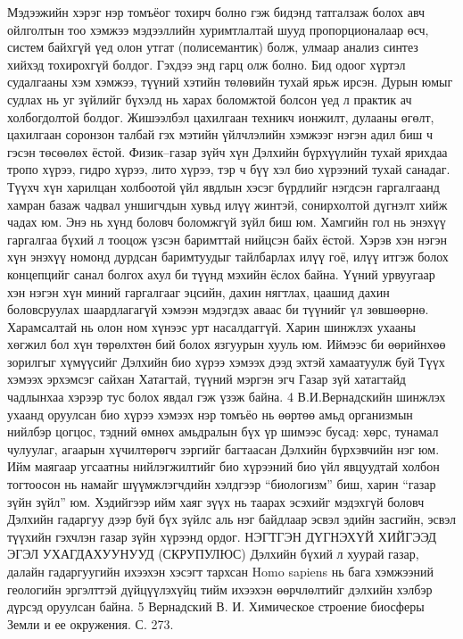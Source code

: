Мэдээжийн хэрэг нэр томъёог тохирч болно гэж бидэнд татгалзаж болох авч ойлголтын тоо хэмжээ мэдээллийн хуримтлалтай шууд пропорционалаар өсч, систем байхгүй үед олон утгат (полисемантик) болж, улмаар анализ синтез хийхэд тохирохгүй болдог. Гэхдээ энд гарц олж болно.
Бид одоог хүртэл судалгааны хэм хэмжээ, түүний хэтийн төлөвийн тухай ярьж ирсэн. Дурын юмыг судлах нь уг зүйлийг бүхэлд нь харах боломжтой болсон үед л практик ач холбогдолтой болдог. Жишээлбэл цахилгаан техникч ионжилт, дулааны өгөлт, цахилгаан соронзон талбай гэх мэтийн үйлчлэлийн хэмжээг нэгэн адил биш ч гэсэн төсөөлөх ёстой. Физик–газар зүйч хүн Дэлхийн бүрхүүлийн тухай ярихдаа тропо хүрээ, гидро хүрээ, лито хүрээ, тэр ч бүү хэл био хүрээний тухай санадаг. Түүхч хүн харилцан холбоотой үйл явдлын хэсэг бүрдлийг нэгдсэн гаргалгаанд хамран базаж чадвал уншигчдын хувьд илүү жинтэй, сонирхолтой дүгнэлт хийж чадах юм. Энэ нь хүнд боловч боломжгүй зүйл биш юм. Хамгийн гол нь энэхүү гаргалгаа бүхий л тооцож үзсэн баримттай нийцсэн байх ёстой. Хэрэв хэн нэгэн хүн энэхүү номонд дурдсан баримтуудыг тайлбарлах илүү гоё, илүү итгэж болох концепцийг санал болгох ахул би түүнд мэхийн ёслох байна.
Үүний урвуугаар хэн нэгэн хүн миний гаргалгааг эцсийн, дахин нягтлах, цаашид дахин боловсруулах шаардлагагүй хэмээн мэдэгдэх аваас би түүнийг үл зөвшөөрнө. Харамсалтай нь олон ном хүнээс урт насалдаггүй. Харин шинжлэх ухааны хөгжил бол хүн төрөлхтөн бий болох язгуурын хууль юм. Иймээс би өөрийнхөө зорилгыг хүмүүсийг Дэлхийн био хүрээ хэмээх дээд эхтэй хамаатуулж буй Түүх хэмээх эрхэмсэг сайхан Хатагтай, түүний мэргэн эгч Газар зүй хатагтайд чадлынхаа хэрээр тус болох явдал гэж үзэж байна.
4 В.И.Вернадскийн шинжлэх ухаанд оруулсан био хүрээ хэмээх нэр томъёо нь өөртөө амьд организмын нийлбэр цогцос, тэдний өмнөх амьдралын бүх үр шимээс бусад: хөрс, тунамал чулуулаг, агаарын хүчилтөрөгч зэргийг багтаасан Дэлхийн бүрхэвчийн нэг юм. Ийм маягаар угсаатны нийлэгжилтийг био хүрээний био үйл явцуудтай холбон тогтоосон нь намайг шүүмжлэгчдийн хэлдгээр “биологизм” биш, харин “газар зүйн зүйл” юм. Хэдийгээр ийм хаяг зүүх нь таарах эсэхийг мэдэхгүй боловч Дэлхийн гадаргуу дээр буй бүх зүйлс аль нэг байдлаар эсвэл эдийн засгийн, эсвэл түүхийн гэхчлэн газар зүйн хүрээнд ордог.
НЭГТГЭН ДҮГНЭХҮЙ ХИЙГЭЭД ЭГЭЛ УХАГДАХУУНУУД (СКРУПУЛЮС)
Дэлхийн бүхий л хуурай газар, далайн гадаргуугийн ихээхэн хэсэгт тархсан Homo sapiens нь бага хэмжээний геологийн эргэлттэй дүйцүүлэхүйц тийм ихээхэн өөрчлөлтийг дэлхийн хэлбэр дүрсэд оруулсан байна.
5 Вернадский В. И. Химическое строение биосферы Земли и ее окружения. С. 273.
